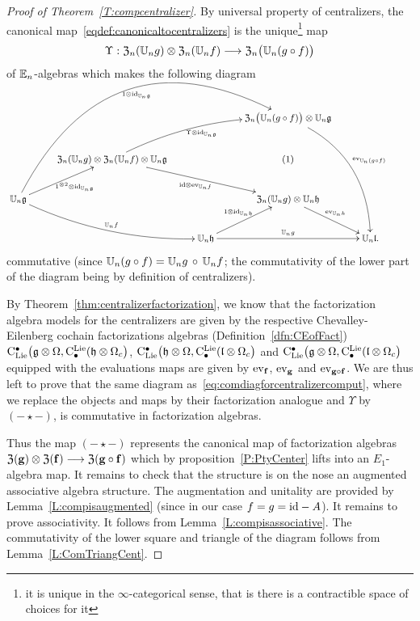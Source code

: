 \documentclass[11pt]{amsart}
\numberwithin{equation}{section}
\begin{document}
\begin{proof}[Proof of Theorem~\ref{T:compcentralizer}]
By universal property of centralizers, the canonical map~\eqref{eqdef:canonicaltocentralizers}  
is the unique\footnote{it is unique in the $\infty$-categorical 
sense, that is there is a contractible space of choices for it} map 
\[ \Upsilon: {\frak Z}_n(\mathbb U_n g) \otimes {\frak Z}_n(\mathbb U_n f) \longrightarrow {\frak Z}_n\big(\mathbb U_n (g\circ f)\big)\] 
of $\mathbb E_n$-algebras which makes the following diagram
\begin{equation}\label{eq:comdiagforcentralizercomput}\small
 \xymatrix{
&   &&  
{\frak Z}_n\big(\UU_n (g\circ f) \big) \otimes  \UU_n \fg  \ar@/^{2pc}/[dddr]^{\ev_{\UU_n (g\circ f)}}\\
&{\frak Z}_n(\UU_n g) \otimes  {\frak Z}_n(\UU_n f) \otimes \UU_n \fg \ar@/^{1pc}/[rru]_{ \Upsilon \otimes \id_{\UU_n \fg}} \ar[rrd]_{\id\otimes \ev_{\UU_n f}}
&& (1)
& & \\
\UU_n \fg \ar[ur]_{1^{\otimes 2}\otimes \id_{\UU_n \fg}} \ar@/_{1pc}/[rrd]^{\UU_n f} \ar@/^{6pc}/[rrruu]_{1\otimes \id_{\UU_n \fg}} &&&
{\frak Z}_n(\UU_n g) \otimes \UU_n \fh \ar[rd]^{\ev_{\UU_n h}}  &\\
&& \UU_n \fh \ar[rr]^{\UU_n g} \ar[ur]^{1\otimes \id_{\UU_n \fh}} && \UU_n \fl .}
\end{equation}
commutative (since $\mathbb U_n (g\circ f) = \mathbb U_n g\, \circ \, \mathbb U_n f $;  the commutativity of the lower part of the diagram being by definition of centralizers).

By Theorem~\ref{thm:centralizerfactorization}, we know that the factorization algebra models for the centralizers are given by the respective Chevalley-Eilenberg cochain factorizations algebras 
(Definition~\ref{dfn:CEofFact}) ${\rm C}_{\rm Lie}^\bullet\big(\mathfrak g \otimes \Omega, {\rm C}^{\rm Lie}_\bullet(\mathfrak h \otimes \Omega_c  \big) $, 
${\rm C}_{\rm Lie}^\bullet\big(\mathfrak h \otimes \Omega, {\rm C}^{\rm Lie}_\bullet(\mathfrak l \otimes \Omega_c  \big) $ and ${\rm C}_{\rm Lie}^\bullet\big(\mathfrak g \otimes \Omega, {\rm C}^{\rm Lie}_\bullet(\mathfrak l \otimes \Omega_c  \big) $ 
equipped with the evaluations maps are given by ${\rm ev}_{\mathbf{f}}$, ${\rm ev}_{\mathbf{g}}$ and ${\rm ev}_{\mathbf{g}\circ \mathbf{f}}$. We are thus left 
to prove that the same  diagram as~\eqref{eq:comdiagforcentralizercomput}, where we replace the objects and maps by their factorization analogue and $\Upsilon$
by $(-\star-)$, is commutative in factorization algebras.

Thus the map $(-\star-)$ represents the canonical map of factorization algebras 
$ {\frak Z}(\mathbf{g}) \otimes {\frak Z}(\mathbf{f}) \longrightarrow {\frak Z}(\mathbf{g}\circ \mathbf{f})$ which by proposition~\ref{P:PtyCenter} lifts
into an $E_1$-algebra map. It remains to check that the structure is on the nose an augmented associative algebra structure.
The augmentation and unitality are provided by Lemma~\ref{L:compisaugmented} (since in our case $f=g={\rm id}-A$). 
It remains to prove associativity. It follows from Lemma~\ref{L:compisassociative}. 
The commutativity of the lower square and triangle of the diagram follows from Lemma~\ref{L:ComTriangCent}.
\end{proof}
\end{document}
